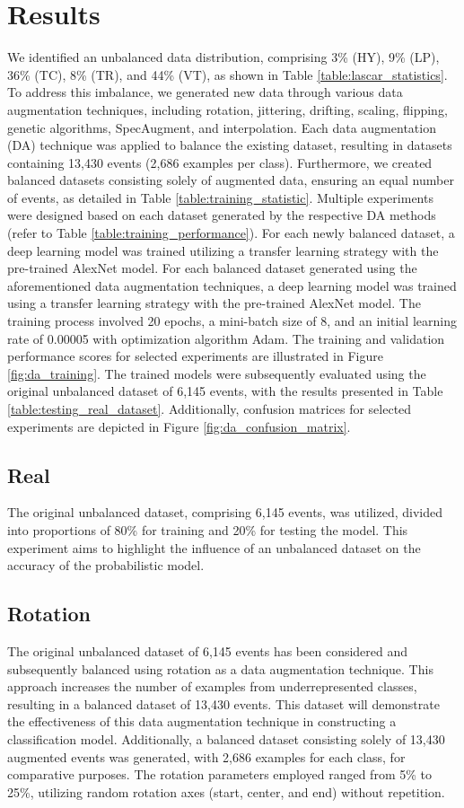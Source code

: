 \documentclass[journal]{IEEEtran}
\begin{document}
\section{Results}\label{results}
We identified an unbalanced data distribution, comprising 3\% (HY), 9\% (LP), 36\% (TC), 8\% (TR), and 44\% (VT), as shown in Table \ref{table:lascar_statistics}. To address this imbalance, we generated new data through various data augmentation techniques, including rotation, jittering, drifting, scaling, flipping, genetic algorithms, SpecAugment, and interpolation. Each data augmentation (DA) technique was applied to balance the existing dataset, resulting in datasets containing 13,430 events (2,686 examples per class). Furthermore, we created balanced datasets consisting solely of augmented data, ensuring an equal number of events, as detailed in Table \ref{table:training_statistic}.
Multiple experiments were designed based on each dataset generated by the respective DA methods (refer to Table \ref{table:training_performance}). For each newly balanced dataset, a deep learning model was trained utilizing a transfer learning strategy with the pre-trained AlexNet model. For each balanced dataset generated using the aforementioned data augmentation techniques, a deep learning model was trained using a transfer learning strategy with the pre-trained AlexNet model. The training process involved 20 epochs, a mini-batch size of 8, and an initial learning rate of 0.00005 with optimization algorithm Adam. The training and validation performance scores for selected experiments are illustrated in Figure \ref{fig:da_training}. The trained models were subsequently evaluated using the original unbalanced dataset of 6,145 events, with the results presented in Table \ref{table:testing_real_dataset}. Additionally, confusion matrices for selected experiments are depicted in Figure \ref{fig:da_confusion_matrix}.

\subsection{Real}
The original unbalanced dataset, comprising 6,145 events, was utilized, divided into proportions of 80\% for training and 20\% for testing the model. This experiment aims to highlight the influence of an unbalanced dataset on the accuracy of the probabilistic model.
\subsection{Rotation}
The original unbalanced dataset of 6,145 events has been considered and subsequently balanced using rotation as a data augmentation technique. This approach increases the number of examples from underrepresented classes, resulting in a balanced dataset of 13,430 events. This dataset will demonstrate the effectiveness of this data augmentation technique in constructing a classification model.
Additionally, a balanced dataset consisting solely of 13,430 augmented events was generated, with 2,686 examples for each class, for comparative purposes.
The rotation parameters employed ranged from 5\% to 25\%, utilizing random rotation axes (start, center, and end) without repetition.
\end{document}

